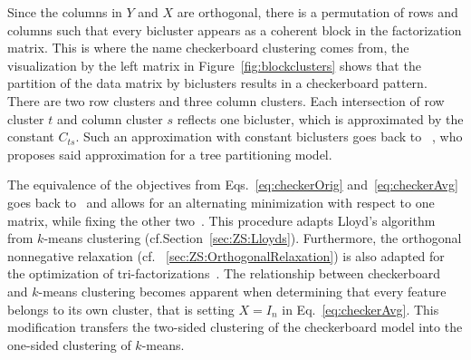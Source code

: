 Since the columns in $Y$ and $X$ are orthogonal, there is a permutation of rows and columns such that every bicluster appears as a coherent block in the factorization matrix. This is where the name checkerboard clustering comes from, the visualization by the left matrix in Figure~\ref{fig:blockclusters} shows that the partition of the data matrix by biclusters results in a checkerboard pattern. There are two row clusters and three column clusters. Each intersection of row cluster $t$ and column cluster $s$ reflects one bicluster, which is approximated by the constant $C_{ts}$. Such an approximation with constant biclusters goes back to ~\cite{hartigan1972direct}, who proposes said approximation for a tree partitioning model.

The equivalence of the objectives from Eqs.~\eqref{eq:checkerOrig} and~\eqref{eq:checkerAvg}  goes back to~\cite{gaul1996new} and allows for an alternating minimization with respect to one matrix, while fixing the other two~\citep{maurizio2001double,wang2011fast,cho2004minimum}. This procedure adapts Lloyd's algorithm from $k$-means clustering (cf.\@ Section~\ref{sec:ZS:Lloyds}). Furthermore, the orthogonal nonnegative relaxation (cf. \@Section~\ref{sec:ZS:OrthogonalRelaxation}) is also adapted for the optimization of tri-factorizations~\citep{ding2006orthogonal, yoo2010orthogonal}. The relationship between checkerboard and $k$-means clustering becomes apparent when determining that every feature belongs to its own cluster, that is setting $X=I_n$ in Eq.~\eqref{eq:checkerAvg}. This modification transfers the two-sided clustering of the checkerboard model into the one-sided clustering of $k$-means. 
